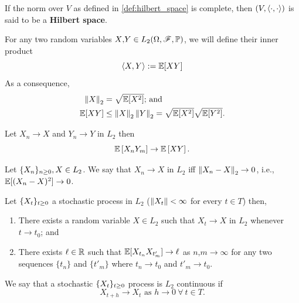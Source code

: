 \documentclass[../TGMAFFIRO]{subfiles}
\begin{document}
\begin{remark}
	If the norm over $V$ as defined in \ref{def:hilbert_space} is complete, then $(V, \langle \cdot, \cdot\rangle)$ is said to be a \textbf{Hilbert space}.
\end{remark}

For any two random variables $X\text{,}Y\in L_2(\Omega, \mathscr{F}, \mathbb{P})$, we will define their inner product
\begin{equation}
	\langle X, Y\rangle := \mathbb{E}[XY]
\end{equation}
As a consequence,
\begin{align}
	\left\lVert X\right\rVert_2 &= \sqrt{\mathbb{E}[X^2]}\text{; and} \\
	\mathbb{E}[XY] &\leq \left\lVert X\right\rVert_2 \left\lVert Y\right\rVert_2 = \sqrt{\mathbb{E}[X^2]} \sqrt{\mathbb{E}[Y^2]}.
\end{align}

\begin{proposition}\label{prop:convergence_expectation}
Let $X_n\to X$ and $Y_n\to Y$ in $L_2$ then
\begin{equation}
  \mathbb{E}\left[X_nY_m\right] \to \mathbb{E}\left[XY\right].
\end{equation}

\end{proposition}

\begin{definition}
	Let $\{X_n\}_{n\geq 0}, X \in L_2$. We say that $X_n\to X$ in $L_2$ iff $\left\lVert X_n - X\right\rVert_2\to 0$, i.e., $\mathbb{E}[(X_n - X)^2] \to 0$.
\end{definition}

\begin{proposition}
	Let $\{X_t\}_{t\geq 0}$ a stochastic process in $L_2$ ($\left\lVert X_t\right\rVert < \infty$ for every $t\in T$) then,
	\begin{enumerate}
		\item There exists a random variable $X\in L_2$ such that $X_t \to X$ in $L_2$ whenever $t\to t_0$; and
		\item There exists $\ell \in \mathbb{R}$ such that $\mathbb{E}[X_{t_n}X_{t'_m}] \to \ell$ as $n\text{,}m \to \infty$ for any two sequences $\{t_n\}$ and $\{t'_m\}$ where $t_n \to t_0$ and $t'_m \to t_0$.
	\end{enumerate}
\end{proposition}


\begin{definition}
We say that a stochastic $\{X_t\}_{t\geq 0}$ process is $L_2$ continuous if
	\begin{equation}
	  X_{t+h} \to X_t \text{ as } h\to 0 \ \forall \ t\in T.
	\end{equation}
\end{definition}
\end{document}
